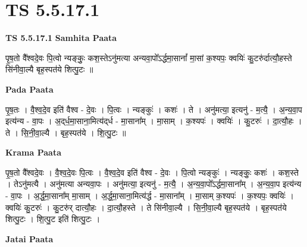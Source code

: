 \documentclass[17pt]{extarticle}
\begin{document}
\section{ TS 5.5.17.1 }

\textbf{TS 5.5.17.1 } \newline
\textbf{Samhita Paata} \newline

पृ॒ष॒तो वै᳚श्वदे॒वः पि॒त्वो न्यङ्कुः॒ कश॒स्तेऽनु॑मत्या अन्यवा॒पो᳚ऽर्द्धमा॒सानां᳚ मा॒सां क॒श्यपः॒ क्वयिः॑ कु॒टरु॑र्दात्यौ॒हस्ते सि॑नीवा॒ल्यै बृह॒स्पत॑ये शित्पु॒टः ॥ \newline

\textbf{Pada Paata} \newline

पृ॒ष॒तः । वै॒श्व॒दे॒व इति॑ वैश्व - दे॒वः । पि॒त्वः । न्यङ्कुः॑ । कशः॑ । ते । अनु॑मत्या॒ इत्यनु॑ - म॒त्यै॒ । अ॒न्य॒वा॒प इत्य॑न्य - वा॒पः । अ॒द्‌र्ध॒मा॒साना॒मित्य॑द्‌र्ध - मा॒साना᳚म् । मा॒साम् । क॒श्यपः॑ । क्वयिः॑ । कु॒टरुः॑ । दा॒त्यौ॒हः । ते । सि॒नी॒वा॒ल्यै । बृह॒स्पत॑ये । शि॒त्पु॒टः ॥  \newline


\textbf{Krama Paata} \newline

पृ॒ष॒तो वै᳚श्वदे॒वः । वै॒श्व॒दे॒वः पि॒त्वः । वै॒श्व॒दे॒व इति॑ वैश्व - दे॒वः । पि॒त्वो न्यङ्कुः॑ । न्यङ्कुः॒ कशः॑ । कश॒स्ते । तेऽनु॑मत्यै । अनु॑मत्या अन्यवा॒पः । अनु॑मत्या॒ इत्यनु॑ - म॒त्यै॒ । अ॒न्य॒वा॒पो᳚ऽर्द्धमा॒साना᳚म् । अ॒न्य॒वा॒प इत्य॑न्य - वा॒पः । अ॒र्द्ध॒मा॒साना᳚म् मा॒साम् । अ॒र्द्ध॒मा॒साना॒मित्य॑र्द्ध - मा॒साना᳚म् । मा॒साम् क॒श्यपः॑ । क॒श्यपः॒ क्वयिः॑ । क्वयिः॑ कु॒टरुः॑ । कु॒टरु॑र् दात्यौ॒हः । दा॒त्यौ॒हस्ते । ते सि॑नीवा॒ल्यै । सि॒नी॒वा॒ल्यै बृह॒स्पत॑ये । बृह॒स्पत॑ये शित्पु॒टः । शि॒त्पु॒ट इति॑ शित्पु॒टः । \newline

\textbf{Jatai Paata} \newline
\end{document}
